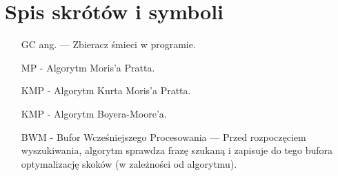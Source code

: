 \chapter{Spis skrótów i symboli}

\begin{itemize}
\item[GC] ang.  — Zbieracz śmieci w programie.
\item[MP] - Algorytm Moris'a Pratta.
\item[KMP] - Algorytm Kurta Moris'a Pratta.
\item[KMP] - Algorytm Boyera-Moore'a.
\item[BWM] - Bufor Wcześniejszego Procesowania — Przed rozpoczęciem wyszukiwania, algorytm sprawdza frazę szukaną i zapisuje do tego bufora
optymalizację skoków (w zależności od algorytmu).
\end{itemize}